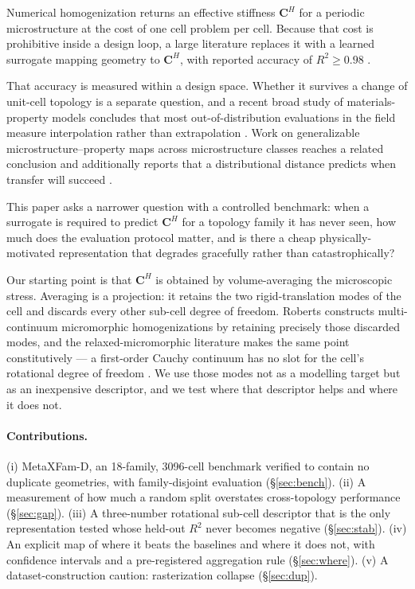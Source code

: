 \documentclass[11pt,a4paper]{article}
\newcommand{\CH}{\mathbf{C}^{H}}
\newcommand{\Rtwo}{R^{2}}
\begin{document}
Numerical homogenization returns an effective stiffness $\CH$ for a periodic microstructure
at the cost of one cell problem per cell. Because that cost is prohibitive inside a design
loop, a large literature replaces it with a learned surrogate mapping geometry to $\CH$,
with reported accuracy of $\Rtwo \ge 0.98$ \citep{bastek2022,kumar2020}.

That accuracy is measured within a design space. Whether it survives a change of
unit-cell topology is a separate question, and a recent broad study of materials-property
models concludes that most out-of-distribution evaluations in the field measure
interpolation rather than extrapolation \citep{li2025}. Work on generalizable
microstructure--property maps across microstructure classes reaches a related conclusion
and additionally reports that a distributional distance predicts when transfer will succeed
\citep{liu2026}.

This paper asks a narrower question with a controlled benchmark: when a surrogate is
required to predict $\CH$ for a topology family it has never seen, how much does the
evaluation protocol matter, and is there a cheap physically-motivated representation that
degrades gracefully rather than catastrophically?

Our starting point is that $\CH$ is obtained by volume-averaging the microscopic stress.
Averaging is a projection: it retains the two rigid-translation modes of the cell and
discards every other sub-cell degree of freedom. Roberts \citep{roberts2025} constructs
multi-continuum micromorphic homogenizations by retaining precisely those discarded modes,
and the relaxed-micromorphic literature makes the same point constitutively --- a
first-order Cauchy continuum has no slot for the cell's rotational degree of freedom
\citep{neff2014}. We use those modes not as a modelling target but as an inexpensive
descriptor, and we test where that descriptor helps and where it does not.

\paragraph{Contributions.}
(i) MetaXFam-D, an 18-family, 3096-cell benchmark verified to contain no duplicate
geometries, with family-disjoint evaluation (\S\ref{sec:bench}).
(ii) A measurement of how much a random split overstates cross-topology performance
(\S\ref{sec:gap}).
(iii) A three-number rotational sub-cell descriptor that is the only representation tested
whose held-out $\Rtwo$ never becomes negative (\S\ref{sec:stab}).
(iv) An explicit map of where it beats the baselines and where it does not, with confidence
intervals and a pre-registered aggregation rule (\S\ref{sec:where}).
(v) A dataset-construction caution: rasterization collapse (\S\ref{sec:dup}).
\end{document}
